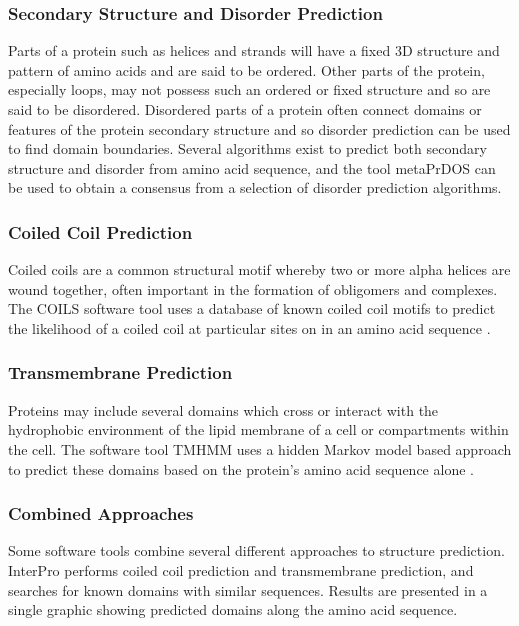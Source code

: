 \documentclass[fleqn,10pt]{article} %
\begin{document}
\subsubsection*{Secondary Structure and Disorder Prediction}

Parts of a protein such as helices and strands will have a fixed 3D structure and pattern of amino acids and are said to be ordered. Other parts of the protein, especially loops, may not possess such an ordered or fixed structure and so are said to be disordered. Disordered parts of a protein often connect domains or features of the protein secondary structure and so disorder prediction can be used to find domain boundaries. Several algorithms exist to predict both secondary structure and disorder from amino acid sequence, and the tool metaPrDOS \cite{Ishida2008} can be used to obtain a consensus from a selection of disorder prediction algorithms.

\subsubsection*{Coiled Coil Prediction}

Coiled coils are a common structural motif whereby two or more alpha helices are wound together, often important in the formation of obligomers and complexes. The COILS software tool uses a database of known coiled coil motifs to predict the likelihood of a coiled coil at particular sites on in an amino acid sequence \cite{Lupas1991}.

\subsubsection*{Transmembrane Prediction}

Proteins may include several domains which cross or interact with the hydrophobic environment of the lipid membrane of a cell or compartments within the cell. The software tool TMHMM uses a hidden Markov model based approach to predict these domains based on the protein's amino acid sequence alone \cite{Krogh2001}.

\subsubsection*{Combined Approaches}

Some software tools combine several different approaches to structure prediction. InterPro \cite{Mulder2002} performs coiled coil prediction and transmembrane prediction, and searches for known domains with similar sequences. Results are presented in a single graphic showing predicted domains along the amino acid sequence.
\end{document}
